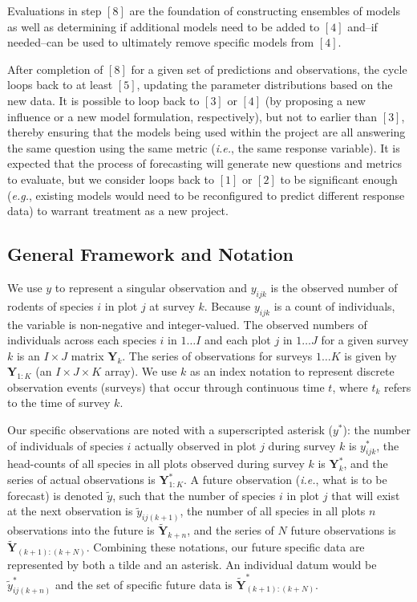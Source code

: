 \documentclass{article}
\begin{document}
Evaluations in step $[8]$ are the foundation of constructing ensembles of models as well as determining if additional models need to be added to $[4]$ and--if needed--can be used to ultimately remove specific models from $[4]$. 

After completion of $[8]$ for a given set of predictions and observations, the cycle loops back to at least $[5]$, updating the parameter distributions based on the new data. It is possible to loop back to $[3]$ or $[4]$ (by proposing a new influence or a new model formulation, respectively), but not to earlier than $[3]$, thereby ensuring that the models being used within the project are all answering the same question using the same metric (\emph{i.e.}, the same response variable). It is expected that the process of forecasting will generate new questions and metrics to evaluate, but we consider loops back to $[1]$ or $[2]$ to be significant enough (\emph{e.g.}, existing models would need to be reconfigured to predict different response data) to warrant treatment as a new project.

\subsection{General Framework and Notation}
\label{subsec:devmods_gf}

We use $y$ to represent a singular observation and $y_{ijk}$ is the observed number of rodents of species $i$ in plot $j$ at survey $k$. Because $y_{ijk}$ is a count of individuals, the variable is non-negative and integer-valued. The observed numbers of individuals across each species $i$ in $1 \ldots I$ and each plot $j$ in $1 \ldots J$ for a given survey $k$ is an $I \times J$ matrix $\textbf{Y}_k$. The series of observations for surveys $1 \ldots K$ is given by $\textbf{Y}_{1:K}$ (an $I \times J \times K$ array). We use $k$ as an index notation to represent discrete observation events (surveys) that occur through continuous time $t$, where $t_k$ refers to the time of survey $k$.

Our specific observations are noted with a superscripted asterisk ($y^{*}$): the number of individuals of species $i$ actually observed in plot $j$ during survey $k$ is $y^{*}_{ijk}$, the head-counts of all species in all plots observed during survey $k$ is $\textbf{Y}^{*}_{k}$, and the series of actual observations is $\textbf{Y}^{*}_{1:K}$. A future observation (\emph{i.e.}, what is to be forecast) is denoted $\tilde{y}$, such that the number of species $i$ in plot $j$ that will exist at the next observation is $\tilde{y}_{ij(k+1)}$, the number of all species in all plots $n$ observations into the future is $\tilde{\textbf{Y}}_{k+n}$, and the series of $N$ future observations is $\tilde{\textbf{Y}}_{(k+1):(k+N)}$. Combining these notations, our future specific data are represented by both a tilde and an asterisk. An individual datum would be $\tilde{y}^{*}_{ij(k+n)}$ and the set of specific future data is $\tilde{\textbf{Y}}^{*}_{(k+1):(k+N)}$.
\end{document}
